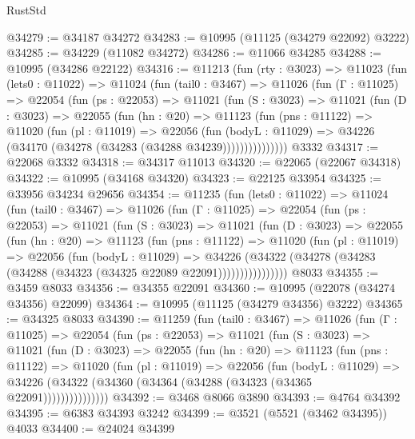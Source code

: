 \begin{lexlean}{RustStd}
\begin{coremodule}
@34279 := @34187 @34272
@34283 := @10995 (@11125 (@34279 @22092) @3222)
@34285 := @34229 (@11082 @34272)
@34286 := @11066 @34285
@34288 := @10995 (@34286 @22122)
@34316 := @11213
    (fun (rty : @3023) =>
    @11023
      (fun (lets0 : @11022) =>
      @11024
        (fun (tail0 : @3467) =>
        @11026
          (fun (Γ : @11025) =>
          @22054
            (fun (ps : @22053) =>
            @11021
              (fun (S : @3023) =>
              @11021
                (fun (D : @3023) =>
                @22055
                  (fun (hn : @20) =>
                  @11123
                    (fun (pns : @11122) =>
                    @11020
                      (fun (pl : @11019) =>
                      @22056
                        (fun (bodyL : @11029) =>
                        @34226 (@34170 (@34278 (@34283 (@34288 @34239)))))))))))))))
    @3332
@34317 := @22068 @3332
@34318 := @34317 @11013
@34320 := @22065 (@22067 @34318)
@34322 := @10995 (@34168 @34320)
@34323 := @22125 @33954
@34325 := @33956 @34234 @29656
@34354 := @11235
    (fun (lets0 : @11022) =>
    @11024
      (fun (tail0 : @3467) =>
      @11026
        (fun (Γ : @11025) =>
        @22054
          (fun (ps : @22053) =>
          @11021
            (fun (S : @3023) =>
            @11021
              (fun (D : @3023) =>
              @22055
                (fun (hn : @20) =>
                @11123
                  (fun (pns : @11122) =>
                  @11020
                    (fun (pl : @11019) =>
                    @22056
                      (fun (bodyL : @11029) =>
                      @34226
                        (@34322
                          (@34278 (@34283 (@34288 (@34323 (@34325 @22089 @22091))))))))))))))))
    @8033
@34355 := @3459 @8033
@34356 := @34355 @22091
@34360 := @10995 (@22078 (@34274 @34356) @22099)
@34364 := @10995 (@11125 (@34279 @34356) @3222)
@34365 := @34325 @8033
@34390 := @11259
    (fun (tail0 : @3467) =>
    @11026
      (fun (Γ : @11025) =>
      @22054
        (fun (ps : @22053) =>
        @11021
          (fun (S : @3023) =>
          @11021
            (fun (D : @3023) =>
            @22055
              (fun (hn : @20) =>
              @11123
                (fun (pns : @11122) =>
                @11020
                  (fun (pl : @11019) =>
                  @22056
                    (fun (bodyL : @11029) =>
                    @34226 (@34322 (@34360 (@34364 (@34288 (@34323 (@34365 @22091)))))))))))))))
@34392 := @3468 @8066 @3890
@34393 := @4764 @34392
@34395 := @6383 @34393 @3242
@34399 := @3521 (@5521 (@3462 @34395)) @4033
@34400 := @24024 @34399

\end{coremodule}
\end{lexlean}
